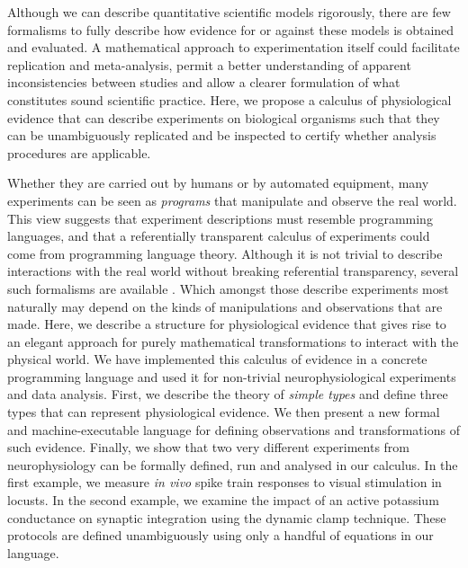 Although we can describe quantitative scientific models rigorously,
there are few formalisms to fully describe how evidence for or against
these models is obtained and evaluated. A mathematical approach to
experimentation itself could facilitate replication and meta-analysis,
permit a better understanding of apparent inconsistencies between
studies and allow a clearer formulation of what constitutes sound
scientific practice.  Here, we propose a calculus of physiological
evidence that can describe experiments on biological organisms such
that they can be unambiguously replicated and be inspected to certify
whether analysis procedures are applicable. 

Whether they are carried out by humans or by automated equipment, many
experiments can be seen as \emph{programs} that manipulate and observe
the real world. This view suggests that experiment descriptions must
resemble programming languages, and that a referentially transparent
calculus of experiments could come from programming language
theory. Although it is not trivial to describe interactions with the
real world without breaking referential transparency, several such
formalisms are available \citep{PeytonJones2002, Roy2004}. Which
amongst those describe experiments most naturally may depend on the
kinds of manipulations and observations that are made. Here, we
describe a structure for physiological evidence that gives rise to an
elegant approach for purely mathematical transformations to interact
with the physical world.  We have implemented this calculus of
evidence in a concrete programming language and used it for
non-trivial neurophysiological experiments and data analysis. First,
we describe the theory of \emph{simple types} and define three types
that can represent physiological evidence. We then present a new
formal and machine-executable language for defining observations and
transformations of such evidence. Finally, we show that two very
different experiments from neurophysiology can be formally defined,
run and analysed in our calculus. In the first example, we measure
\emph{in vivo} spike train responses to visual stimulation in
locusts. In the second example, we examine the impact of an active
potassium conductance on synaptic integration using the dynamic clamp
technique. These protocols are defined unambiguously using only a
handful of equations in our language. 
